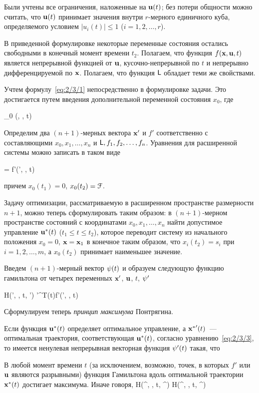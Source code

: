     \item
        Были учтены все ограничения, наложенные на $\mathbf{u}(t)$; без потери общности можно считать, что $\mathbf{u}(t)$ принимает значения внутри $r$-мерного единичного куба, определяемого условием $|u_i(t)| \leqslant 1$ ($i = 1,2,\ldots,r$).
\eenum

В приведенной формулировке некоторые переменные состояния остались свободными в конечный момент времени $t_2$. Полагаем, что функция $f(\mathbf{x}, \mathbf{u}, t)$ является непрерывной функцией от $\mathbf{u}$, кусочно-непрерывной по $t$ и непрерывно дифференцируемой по $\mathbf{x}$. Полагаем, что функция $\mathsf{L}$ обладает теми же свойствами.

Учтем формулу~\ref{eq:2/3/1} непосредственно в формулировке задачи. Это достигается путем введения дополнительной переменной состояния $x_0$, где

    _0 \equiv \funcL(, , t) 
\eeq

Определим два $(n+1)$-мерных вектора $\mathbf{x}'$ и $f'$ соответственно с составляющими $x_0, x_1, \ldots, x_n$ и $\mathsf{L}, f_1, f_2, \ldots, f_n$. Уравнения для расширенной системы можно записать в таком виде

     = f'(', , t) \text{,}
\eeq

причем $x_0(t_1) = 0$, $x_0(t_2) = \mathcal{F}$.

Задачу оптимизации, рассматриваемую в расширенном пространстве размерности $n+1$, можно теперь сформулировать таким образом: в $(n+1)$-мерном пространстве состояний с координатами $x_0, x_1, \ldots, x_n$ найти допустимое управление ${\mathbf{u}^{*}}(t)$ ($t_1 \leqslant t \leqslant t_2$), которое переводит систему из начального положения $x_0 = 0$, $\mathbf{x} = \mathbf{x}_1$ в конечное таким образом, что $x_i(t_2) = s_i$ при $i = 1, 2, \ldots, m$, а $x_0(t_2)$ принимает наименьшее значение.

Введем $(n+1)$-мерный вектор $\mathbf{\psi}(t)$ и образуем следующую функцию гамильтона от четырех переменных $\mathbf{x}'$, $\mathbf{u}$, $t$, $\mathbf{\psi}'$

    H(', , t, \m{\psi}') \eqdef \m{\psi}'^T(t)f'(', , t) 
\eeq

Сформулируем теперь \emph{принцип максимума} Понтрягина.

    Если функция ${\mathbf{u}^{*}}(t)$ определяет оптимальное управление, а ${\mathbf{x}^{*}}^\prime(t)$~--- оптимальная траектория, соответствующая ${\mathbf{u}^{*}}(t)$, согласно уравнению~\ref{eq:2/3/3}, то имеется ненулевая непрерывная векторная функция $\mathbf{\psi}^\prime(t)$ такая, что
    \benum
        \item
            В любой момент времени $t$ (за исключением, возможно, точек, в которых $f'$ или $\mathbf{u}$ являются разрывными) функция Гамильтона вдоль оптимальной траектории ${\mathbf{x}^{*}}(t)$ достигает максимума. Иначе говоря,
            \beqn
                H(\optX^\prime, \optU, t, \m{\psi}^\prime) \geqslant H(\optX^\prime, , t, \m{\psi}^\prime) 
            \eeqn

